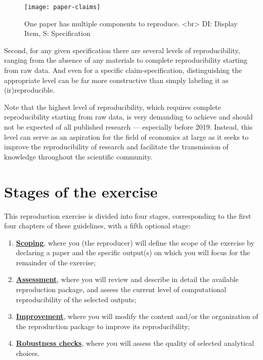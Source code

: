 \documentclass[]{book}
\providecommand{\tightlist}{%
  \setlength{\itemsep}{0pt}\setlength{\parskip}{0pt}}
\begin{document}
\begin{figure}
\texttt{[image: paper-claims]} \caption{One paper has multiple components to reproduce. <br> DI: Display Item, S: Specification }\label{fig:diagram}
\end{figure}

Second, for any given specification there are several levels of reproducibility, ranging from the absence of any materials to complete reproducibility starting from raw data. And even for a specific claim-specification, distinguishing the appropriate level can be far more constructive than simply labeling it as (ir)reproducible.

Note that the highest level of reproducibility, which requires complete reproducibility starting from raw data, is very demanding to achieve and should not be expected of all published research --- especially before 2019. Instead, this level can serve as an aspiration for the field of economics at large as it seeks to improve the reproducibility of research and facilitate the transmission of knowledge throughout the scientific community.

\hypertarget{stages-of-the-exercise}{%
\section*{Stages of the exercise}\label{stages-of-the-exercise}}

This reproduction exercise is divided into four stages, corresponding to the first four chapters of these guidelines, with a fifth optional stage:

\begin{enumerate}
\def\labelenumi{\arabic{enumi}.}
\tightlist
\item
  \protect\hyperlink{scoping}{\textbf{Scoping}}, where you (the reproducer) will define the scope of the exercise by declaring a paper and the specific output(s) on which you will focus for the remainder of the exercise;\\
\item
  \protect\hyperlink{assessment}{\textbf{Assessment}}, where you will review and describe in detail the available reproduction package, and assess the current level of computational reproducibility of the selected outputs;
\item
  \protect\hyperlink{improvements}{\textbf{Improvement}}, where you will modify the content and/or the organization of the reproduction package to improve its reproducibility;\\
\item
  \protect\hyperlink{robust}{\textbf{Robustness checks}}, where you will assess the quality of selected analytical choices.
\end{enumerate}
\end{document}
